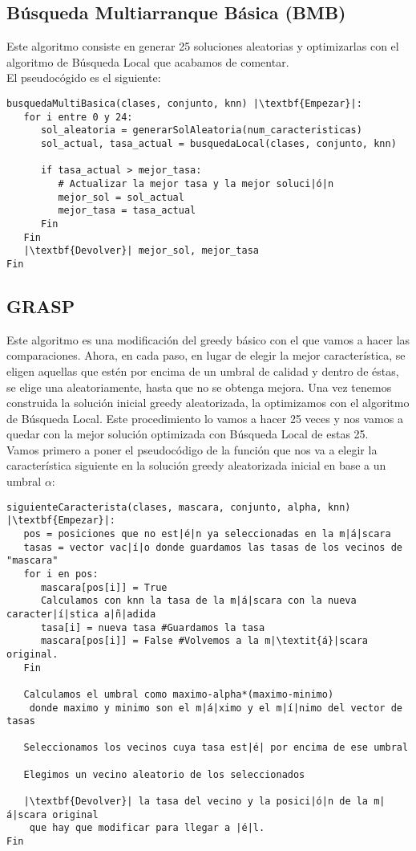 \documentclass[12pt]{article}
\begin{document}
\subsection{Búsqueda Multiarranque Básica (BMB)}

Este algoritmo consiste en generar 25 soluciones aleatorias y optimizarlas con el algoritmo de Búsqueda Local que acabamos de comentar.\\
El pseudocógido es el siguiente:
\begin{lstlisting}
busquedaMultiBasica(clases, conjunto, knn) |\textbf{Empezar}|:
   for i entre 0 y 24:
      sol_aleatoria = generarSolAleatoria(num_caracteristicas)
      sol_actual, tasa_actual = busquedaLocal(clases, conjunto, knn)
		
      if tasa_actual > mejor_tasa:
         # Actualizar la mejor tasa y la mejor soluci|ó|n
         mejor_sol = sol_actual
         mejor_tasa = tasa_actual
      Fin
   Fin
   |\textbf{Devolver}| mejor_sol, mejor_tasa
Fin
\end{lstlisting}

\subsection{GRASP}

Este algoritmo es una modificación del greedy básico con el que vamos a hacer las comparaciones. Ahora, en cada paso, en lugar de elegir la mejor característica, se eligen aquellas que estén por encima de un umbral de calidad y dentro de éstas, se elige una aleatoriamente, hasta que no se obtenga mejora. Una vez tenemos construida la solución inicial greedy aleatorizada, la optimizamos con el algoritmo de Búsqueda Local. Este procedimiento lo vamos a hacer 25 veces y nos vamos a quedar con la mejor solución optimizada con Búsqueda Local de estas 25.\\

Vamos primero a poner el pseudocódigo de la función que nos va a elegir la característica siguiente en la solución greedy aleatorizada inicial en base a un umbral $\alpha$:
\begin{lstlisting}
siguienteCaracterista(clases, mascara, conjunto, alpha, knn) |\textbf{Empezar}|:
   pos = posiciones que no est|é|n ya seleccionadas en la m|á|scara
   tasas = vector vac|í|o donde guardamos las tasas de los vecinos de "mascara"
   for i en pos:
      mascara[pos[i]] = True
      Calculamos con knn la tasa de la m|á|scara con la nueva caracter|í|stica a|ñ|adida
      tasa[i] = nueva tasa #Guardamos la tasa
      mascara[pos[i]] = False #Volvemos a la m|\textit{á}|scara original.
   Fin
   
   Calculamos el umbral como maximo-alpha*(maximo-minimo)
    donde maximo y minimo son el m|á|ximo y el m|í|nimo del vector de tasas
   
   Seleccionamos los vecinos cuya tasa est|é| por encima de ese umbral
   
   Elegimos un vecino aleatorio de los seleccionados
   
   |\textbf{Devolver}| la tasa del vecino y la posici|ó|n de la m|á|scara original
    que hay que modificar para llegar a |é|l.
Fin
\end{lstlisting}
\end{document}
